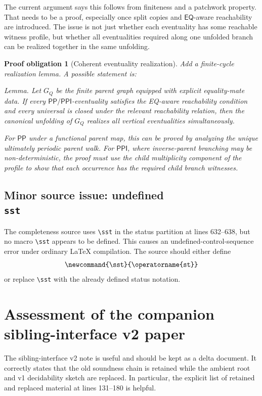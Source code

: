 \documentclass[11pt]{article}
\newcommand{\PP}{\mathsf{PP}}
\newcommand{\PPI}{\mathsf{PPI}}
\newcommand{\EQ}{\mathsf{EQ}}
\newtheorem{obligation}{Proof obligation}
\begin{document}
The current argument says this follows from finiteness and a patchwork property.
That needs to be a proof, especially once split copies and \(\EQ\)-aware
reachability are introduced.  The issue is not just whether each eventuality has
some reachable witness profile, but whether all eventualities required along one
unfolded branch can be realized together in the same unfolding.

\begin{obligation}[Coherent eventuality realization]
Add a finite-cycle realization lemma.  A possible statement is:

\medskip
\noindent\emph{Lemma.}  Let \(G_Q\) be the finite parent graph equipped with
explicit equality-mate data.  If every \(\PP/\PPI\)-eventuality satisfies the
EQ-aware reachability condition and every universal is closed under the relevant
reachability relation, then the canonical unfolding of \(G_Q\) realizes all
vertical eventualities simultaneously.

\medskip
For \(\PP\) under a functional parent map, this can be proved by analyzing the
unique ultimately periodic parent walk.  For \(\PPI\), where inverse-parent
branching may be non-deterministic, the proof must use the child multiplicity
component of the profile to show that each occurrence has the required child
branch witnesses.
\end{obligation}

\subsection{Minor source issue: undefined \texttt{\\sst}}

The completeness source uses \verb|\sst| in the status partition at lines
632--638, but no macro \verb|\sst| appears to be defined.  This causes an
undefined-control-sequence error under ordinary LaTeX compilation.  The source
should either define
\[
  \verb|\newcommand{\sst}{\operatorname{st}}|
\]
or replace \verb|\sst| with the already defined status notation.

\section{Assessment of the companion sibling-interface v2 paper}

The sibling-interface v2 note is useful and should be kept as a delta document.
It correctly states that the old soundness chain is retained while the ambient
root and v1 decidability sketch are replaced.  In particular, the explicit list
of retained and replaced material at lines 131--180 is helpful.
\end{document}
